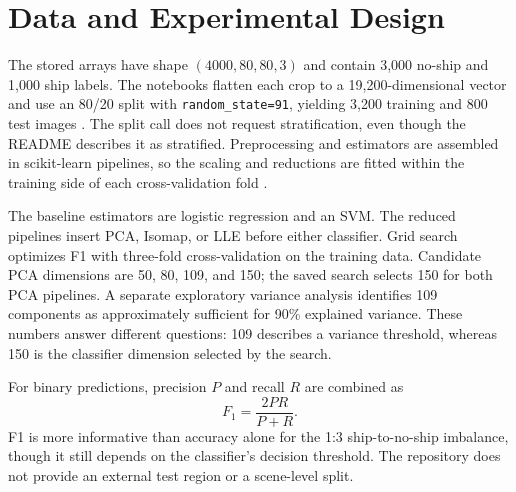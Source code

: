 \documentclass[conference]{IEEEtran}
\begin{document}
\section{Data and Experimental Design}
The stored arrays have shape $(4000,80,80,3)$ and contain 3,000 no-ship and 1,000 ship labels. The notebooks flatten each crop to a 19,200-dimensional vector and use an 80/20 split with \texttt{random\_state=91}, yielding 3,200 training and 800 test images \cite{repo}. The split call does not request stratification, even though the README describes it as stratified. Preprocessing and estimators are assembled in scikit-learn pipelines, so the scaling and reductions are fitted within the training side of each cross-validation fold \cite{sklearn,repo}.

The baseline estimators are logistic regression and an SVM. The reduced pipelines insert PCA, Isomap, or LLE before either classifier. Grid search optimizes F1 with three-fold cross-validation on the training data. Candidate PCA dimensions are 50, 80, 109, and 150; the saved search selects 150 for both PCA pipelines. A separate exploratory variance analysis identifies 109 components as approximately sufficient for 90\% explained variance. These numbers answer different questions: 109 describes a variance threshold, whereas 150 is the classifier dimension selected by the search.

For binary predictions, precision $P$ and recall $R$ are combined as
\begin{equation}
F_1=\frac{2PR}{P+R}.
\end{equation}
F1 is more informative than accuracy alone for the 1:3 ship-to-no-ship imbalance, though it still depends on the classifier's decision threshold. The repository does not provide an external test region or a scene-level split.
\end{document}
